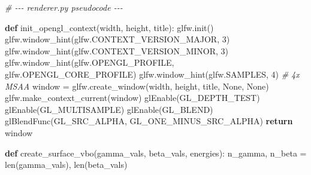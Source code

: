 \documentclass[
  11pt,
]{report}
\newenvironment{Shaded}{}{}
\newcommand{\BuiltInTok}[1]{\textcolor[rgb]{0.00,0.50,0.00}{#1}}
\newcommand{\CommentTok}[1]{\textcolor[rgb]{0.38,0.63,0.69}{\textit{#1}}}
\newcommand{\ControlFlowTok}[1]{\textcolor[rgb]{0.00,0.44,0.13}{\textbf{#1}}}
\newcommand{\DecValTok}[1]{\textcolor[rgb]{0.25,0.63,0.44}{#1}}
\newcommand{\KeywordTok}[1]{\textcolor[rgb]{0.00,0.44,0.13}{\textbf{#1}}}
\newcommand{\NormalTok}[1]{#1}
\newcommand{\OperatorTok}[1]{\textcolor[rgb]{0.40,0.40,0.40}{#1}}
\newcommand{\VariableTok}[1]{\textcolor[rgb]{0.10,0.09,0.49}{#1}}
\begin{document}
\begin{Shaded}
\begin{Highlighting}[]
\CommentTok{\# {-}{-}{-} renderer.py pseudocode {-}{-}{-}}

\KeywordTok{def}\NormalTok{ init\_opengl\_context(width, height, title):}
\NormalTok{    glfw.init()}
\NormalTok{    glfw.window\_hint(glfw.CONTEXT\_VERSION\_MAJOR, }\DecValTok{3}\NormalTok{)}
\NormalTok{    glfw.window\_hint(glfw.CONTEXT\_VERSION\_MINOR, }\DecValTok{3}\NormalTok{)}
\NormalTok{    glfw.window\_hint(glfw.OPENGL\_PROFILE, glfw.OPENGL\_CORE\_PROFILE)}
\NormalTok{    glfw.window\_hint(glfw.SAMPLES, }\DecValTok{4}\NormalTok{)              }\CommentTok{\# 4x MSAA}
\NormalTok{    window }\OperatorTok{=}\NormalTok{ glfw.create\_window(width, height, title, }\VariableTok{None}\NormalTok{, }\VariableTok{None}\NormalTok{)}
\NormalTok{    glfw.make\_context\_current(window)}
\NormalTok{    glEnable(GL\_DEPTH\_TEST)}
\NormalTok{    glEnable(GL\_MULTISAMPLE)}
\NormalTok{    glEnable(GL\_BLEND)}
\NormalTok{    glBlendFunc(GL\_SRC\_ALPHA, GL\_ONE\_MINUS\_SRC\_ALPHA)}
    \ControlFlowTok{return}\NormalTok{ window}


\KeywordTok{def}\NormalTok{ create\_surface\_vbo(gamma\_vals, beta\_vals, energies):}
\NormalTok{    n\_gamma, n\_beta }\OperatorTok{=} \BuiltInTok{len}\NormalTok{(gamma\_vals), }\BuiltInTok{len}\NormalTok{(beta\_vals)}


\end{Highlighting}
\end{Shaded}
\end{document}
